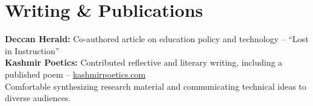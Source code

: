\documentclass[10pt,a4paper]{article}
\begin{document}
\section*{Writing \& Publications}

\textbf{Deccan Herald:} Co-authored article on education policy and technology -- ``Lost in Instruction''\\
\textbf{Kashmir Poetics:} Contributed reflective and literary writing, including a published poem -- \href{https://kashmirpoetics.com}{kashmirpoetics.com}\\
Comfortable synthesizing research material and communicating technical ideas to diverse audiences.
\end{document}

